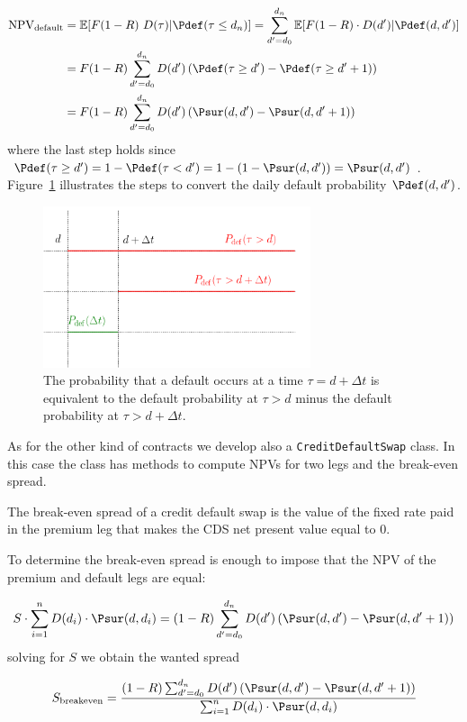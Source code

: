 \begin{align}
\begin{split}
\mathrm{NPV_{default}} &= \mathbb{E}[F(1-R)~D(\tau)|\Pdef(\tau \leq d_n) ] = \sum_{d'=d_0}^{d_n} \mathbb{E}[F(1-R) \cdot D(d')|\Pdef(d, d')] \\
&= F(1-R) \sum_{d'=d_0}^{d_n} D(d') \left(\Pdef(\tau \geq d') - \Pdef( \tau \geq d'+1) \right) \\
&= F(1-R) \sum_{d'=d_0}^{d_n} D(d') \left(\Psur(d, d') - \Psur(d, d'+1) \right)
\end{split}
\end{align}
where the last step holds since $\Pdef(\tau\geq d') = 1 - \Pdef(\tau < d') = 1 - (1-\Psur(d, d')) = \Psur(d, d')$. 
Figure~\ref{fig:default_p} illustrates the steps to convert the daily default probability $\Pdef(d, d')$.

\begin{figure}[htb]
\centering
\includegraphics[width=0.7\textwidth]{figures/timeline}
\caption{The probability that a default occurs at a time $\tau = d+\Delta t$ is equivalent to the default probability at $\tau > d$ minus the default probability at $\tau>d+\Delta t$.}
\label{fig:default_p}
\end{figure}

\begin{finmarkets}
As for the other kind of contracts we develop also a \texttt{CreditDefaultSwap} class. In this case the class has methods to compute NPVs for two legs and the break-even spread.

The break-even spread of a credit default swap is the value of the fixed rate paid in the premium leg that makes the CDS net present value equal to 0.

To determine the break-even spread is enough to impose that the NPV of the premium and default legs are equal:

\begin{equation}
S \cdot\sum_{i=1}^{n} D(d_i) \cdot \Psur(d, d_i)
= (1-R) \sum_{d'=d_0}^{d_n} D(d') \left(\Psur(d, d') - \Psur(d, d'+1) \right)
\end{equation}
solving for $S$ we obtain the wanted spread

\begin{equation}
S_{\mathrm{breakeven}} = \cfrac{(1-R) \sum_{d'=d_0}^{d_n} D(d') \left(\Psur(d, d') - \Psur(d, d'+1) \right)}{\sum_{i=1}^{n} D(d_i) \cdot \Psur(d, d_i)}
\end{equation}
\end{finmarkets}


